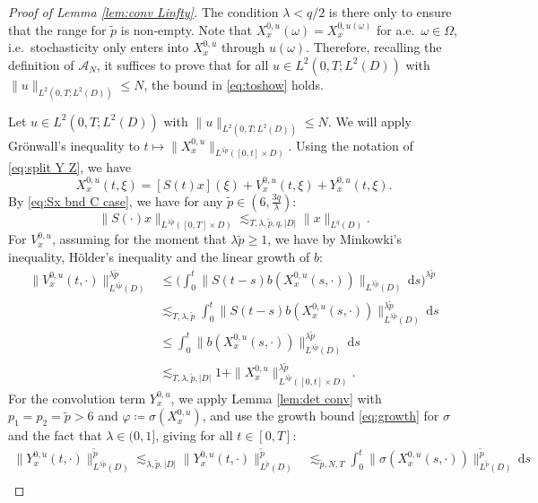\documentclass[10pt,a4paper]{amsart}
\numberwithin{equation}{section}
\newcommand{\ceqq}{\coloneqq}
\newcommand{\Om}{\Omega}
\newcommand{\om}{\omega}
\newcommand{\A}{{\mathcal A}}
\newcommand{\dd}{\,\mathrm{d}}
\begin{document}
\begin{proof}[Proof of Lemma \ref{lem:conv Linfty}]
The condition $\lambda <{q}/{2}$ is there only to  ensure that the range for $\tilde p$ is non-empty. 
Note that $X_x^{0,u}(\om)=X_x^{0,u(\om)}$ for a.e.\ $\om\in\Om$, i.e.\ stochasticity only enters into $X_x^{0,u}$ through $u(\om)$. Therefore, recalling the definition of $\A_N$, it suffices to prove that for all $u\in L^2(0,T;L^2(D))$ with $\|u\|_{L^2(0,T;L^2(D))}\leq N$, the bound in \eqref{eq:toshow} holds.  

Let $u\in L^2(0,T;L^2(D))$  with $\|u\|_{L^2(0,T;L^2(D))}\leq N$. We will apply Gr\"onwall's inequality to $t\mapsto  \|X_x^{0,u}\|_{L^{\lambda \tilde p}([0,t]\times D)}$.   
Using the notation of \eqref{eq:split Y Z}, we have
\[
  X_x^{0,u}(t,\xi)= 
  [S(t)x](\xi)+V_x^{0,u}(t,\xi)+Y_x^{0,u}(t,\xi). 
\]
By \eqref{eq:Sx bnd C case}, we have for any $\tilde p\in (6,\frac{3q}{\lambda})$:  
\begin{equation}\label{eq:Sx est}
\|S(\cdot)x\|_{L^{\lambda \tilde p}([0,T]\times D)}\lesssim_{T,\lambda,\tilde p,q,|D|} \|x\|_{L^q(D)}.
\end{equation} 
For $V_x^{0,u}$,  assuming for the moment that $\lambda\tilde p\geq 1$, we have 
by Minkowki's inequality, H\"older's inequality and the linear growth of $b$:
\begin{align*}
\|V_x^{0,u}(t,\cdot)\|_{L^{\lambda\tilde p}(D)}^{\lambda\tilde p}
&\leq \Big(\int_0^t\|S(t-s)b(X_x^{0,u}(s,\cdot))\|_{L^{\lambda\tilde p}(D)}\dd s\Big)^{\lambda\tilde p}\\
&\lesssim_{T,\lambda,\tilde p} \int_0^t\|S(t-s)b(X_x^{0,u}(s,\cdot))\|_{L^{\lambda\tilde p}(D)}^{\lambda\tilde p}\dd s \\
&\leq \int_0^t\|b(X_x^{0,u}(s,\cdot))\|_{L^{\lambda\tilde p}(D)}^{\lambda\tilde p}\dd s\\
&\lesssim_{T,\lambda,\tilde p,|D|} 1+ \|X_x^{0,u}\|_{L^{\lambda\tilde p}([0,t]\times D)}^{\lambda\tilde p}.
\end{align*}
For the convolution term $Y_x^{0,u}$, we apply Lemma \ref{lem:det conv}   with $p_1=p_2= \tilde p>6$ and $\varphi\ceqq \sigma(X_x^{0,u})$, and use the growth bound \eqref{eq:growth} for $\sigma$ and the fact that $\lambda \in (0,1]$, giving  for all $t\in[0,T]$:  
\begin{align*}
  \|Y_x^{0,u}(t,\cdot)\|_{L^{\lambda\tilde p}(D)}^{\tilde p}
  \lesssim_{\lambda,\tilde p,|D|}\|Y_x^{0,u}(t,\cdot)\|_{L^{\tilde p}(D)}^{\tilde p} 
  &\lesssim_{\tilde p,N,T} \int_0^t \|\sigma(X_x^{0,u}(s,\cdot))\|_{L^{\tilde p}(D)}^{\tilde p}\dd s \\

\end{align*}
\end{proof}
\end{document}

